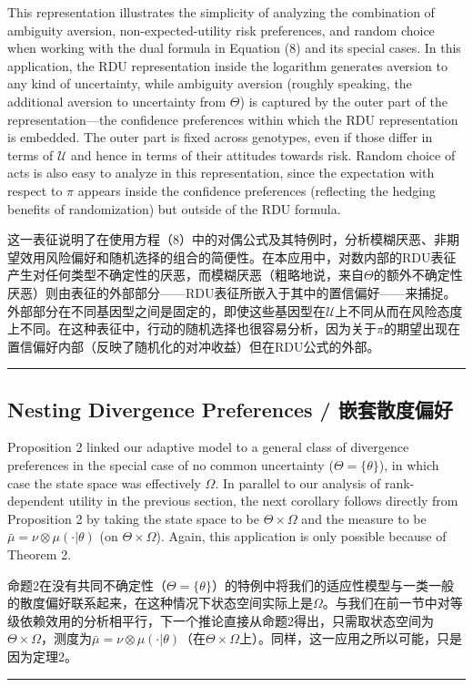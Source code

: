 \documentclass[12pt,a4paper]{article}
\newenvironment{original}
  {\par\noindent\color{black}\smallskip}
  {\par\smallskip}
\newenvironment{translation}
  {\par\noindent\color{blue!70!black}\smallskip}
  {\par\medskip\hrule\medskip}
\begin{document}
\begin{original}
This representation illustrates the simplicity of analyzing the combination of ambiguity aversion, non-expected-utility risk preferences, and random choice when working with the dual formula in Equation (8) and its special cases. In this application, the RDU representation inside the logarithm generates aversion to any kind of uncertainty, while ambiguity aversion (roughly speaking, the additional aversion to uncertainty from $\Theta$) is captured by the outer part of the representation---the confidence preferences within which the RDU representation is embedded. The outer part is fixed across genotypes, even if those differ in terms of $\mathcal{U}$ and hence in terms of their attitudes towards risk. Random choice of acts is also easy to analyze in this representation, since the expectation with respect to $\pi$ appears inside the confidence preferences (reflecting the hedging benefits of randomization) but outside of the RDU formula.
\end{original}
\begin{translation}
这一表征说明了在使用方程（8）中的对偶公式及其特例时，分析模糊厌恶、非期望效用风险偏好和随机选择的组合的简便性。在本应用中，对数内部的RDU表征产生对任何类型不确定性的厌恶，而模糊厌恶（粗略地说，来自$\Theta$的额外不确定性厌恶）则由表征的外部部分——RDU表征所嵌入于其中的置信偏好——来捕捉。外部部分在不同基因型之间是固定的，即使这些基因型在$\mathcal{U}$上不同从而在风险态度上不同。在这种表征中，行动的随机选择也很容易分析，因为关于$\pi$的期望出现在置信偏好内部（反映了随机化的对冲收益）但在RDU公式的外部。
\end{translation}

\subsection{Nesting Divergence Preferences / 嵌套散度偏好}

\begin{original}
Proposition 2 linked our adaptive model to a general class of divergence preferences in the special case of no common uncertainty ($\Theta = \{\theta\}$), in which case the state space was effectively $\Omega$. In parallel to our analysis of rank-dependent utility in the previous section, the next corollary follows directly from Proposition 2 by taking the state space to be $\Theta \times \Omega$ and the measure to be $\bar{\mu} = \nu \otimes \mu(\cdot|\theta)$ (on $\Theta \times \Omega$). Again, this application is only possible because of Theorem 2.
\end{original}
\begin{translation}
命题2在没有共同不确定性（$\Theta = \{\theta\}$）的特例中将我们的适应性模型与一类一般的散度偏好联系起来，在这种情况下状态空间实际上是$\Omega$。与我们在前一节中对等级依赖效用的分析相平行，下一个推论直接从命题2得出，只需取状态空间为$\Theta \times \Omega$，测度为$\bar{\mu} = \nu \otimes \mu(\cdot|\theta)$（在$\Theta \times \Omega$上）。同样，这一应用之所以可能，只是因为定理2。
\end{translation}
\end{document}
